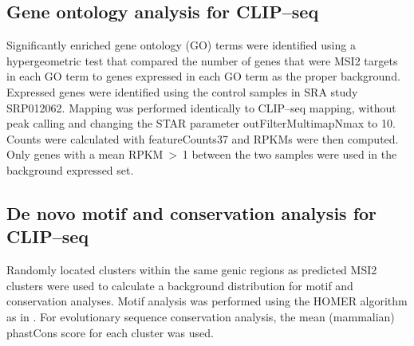 \subsection{Gene ontology analysis for CLIP–seq}
Significantly enriched gene ontology (GO) terms were identified using a hypergeometric test that compared the number of genes that were MSI2 targets in each GO term to genes expressed in each GO term as the proper background. Expressed genes were identified using the control samples in SRA study SRP012062. Mapping was performed identically to CLIP–seq mapping, without peak calling and changing the STAR parameter outFilterMultimapNmax to 10. Counts were calculated with featureCounts37 and RPKMs were then computed. Only genes with a mean RPKM $>$ 1 between the two samples were used in the background expressed set.

\subsection{De novo motif and conservation analysis for CLIP–seq}
Randomly located clusters within the same genic regions as predicted MSI2 clusters were used to calculate a background distribution for motif and conservation analyses. Motif analysis was performed using the HOMER algorithm as in \cite{Lovci2013}. For evolutionary sequence conservation analysis, the mean (mammalian) phastCons score for each cluster was used.

